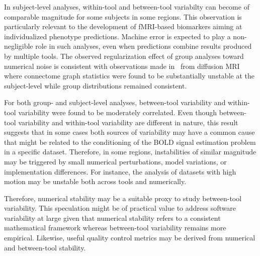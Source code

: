 \documentclass[11pt,onecolumn]{article}
\begin{document}
In subject-level analyses, within-tool and between-tool variabilty can become
of comparable magnitude for some subjects in some regions. This observation
is particularly relevant to the development of fMRI-based biomarkers aiming
at individualized phenotype predictions. Machine error is expected to play
a non-negligible role in such analyses, even when predictions combine
results produced by multiple tools. The observed regularization effect of
group analyses toward numerical noise is consistent with observations made
in~\cite{kiar2020numerical} from diffusion MRI where connectome graph
statistics were found to be substantially unstable at the subject-level
while group distributions remained consistent. 

For both group- and subject-level analyses, between-tool variability and within-tool
variability were found to be moderately correlated. Even though between-tool
variability and within-tool  variability are different in nature, this result
suggests that in some cases both sources of variability may have a common
cause that might be related to the conditioning of the BOLD signal
estimation problem  in a specific dataset. Therefore, in some regions,
instabilities of similar magnitude may be triggered by small numerical
perturbations, model variations, or implementation differences. For
instance, the analysis of datasets with high motion may be unstable both
across tools and numerically.

Therefore, numerical stability may be a suitable proxy to study
between-tool variability. This speculation might be of practical value to
address software variability at large given that numerical stability refers
to a consistent mathematical framework whereas between-tool variability
remains more empirical. Likewise, useful quality control metrics may be derived from numerical and between-tool stability.
\end{document}
